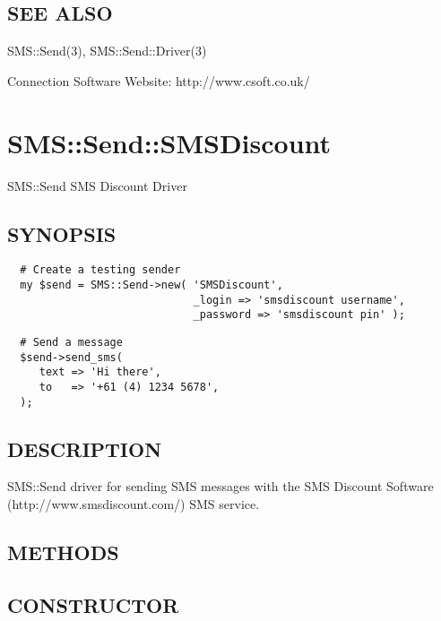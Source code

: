 \subsection*{SEE ALSO\label{SMS::Send::CSoft_SEE_ALSO}}


SMS::Send(3), SMS::Send::Driver(3)



Connection Software Website: http://www.csoft.co.uk/

\section{SMS::Send::SMSDiscount\label{SMS::Send::SMSDiscount}}


SMS::Send SMS Discount Driver

\subsection*{SYNOPSIS\label{SMS::Send::SMSDiscount_SYNOPSIS}}
\begin{verbatim}
  # Create a testing sender
  my $send = SMS::Send->new( 'SMSDiscount',
                             _login => 'smsdiscount username',
                             _password => 'smsdiscount pin' );
\end{verbatim}
\begin{verbatim}
  # Send a message
  $send->send_sms(
     text => 'Hi there',
     to   => '+61 (4) 1234 5678',
  );
\end{verbatim}
\subsection*{DESCRIPTION\label{SMS::Send::SMSDiscount_DESCRIPTION}}


SMS::Send driver for sending SMS messages with the SMS Discount
Software (http://www.smsdiscount.com/) SMS service.

\subsection*{METHODS\label{SMS::Send::SMSDiscount_METHODS}}
\subsection*{CONSTRUCTOR\label{SMS::Send::SMSDiscount_CONSTRUCTOR}}
